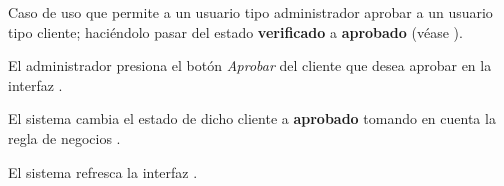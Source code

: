 %
%

{
  Caso de uso que permite a un usuario tipo administrador aprobar a un usuario
  tipo cliente; haciéndolo pasar del estado \textbf{verificado} a
  \textbf{aprobado} (véase ).

  \begin{trayectoriaPrincipal}

    \item El administrador presiona el botón \textit{Aprobar} del cliente que
      desea aprobar en la interfaz .

    \item El sistema cambia el estado de dicho cliente a \textbf{aprobado}
      tomando en cuenta la regla de negocios .

    \item El sistema refresca la interfaz .

  \end{trayectoriaPrincipal}
}
